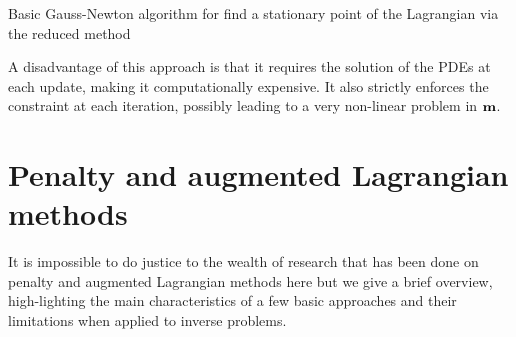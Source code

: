 \documentclass{iopart}
\begin{document}
\begin{algorithm}
\caption{Basic Gauss-Newton algorithm for find a stationary point of the Lagrangian via the reduced method}
\label{alg:reduced}
\begin{algorithmic}
\vspace{1mm}
\vspace{1mm}
\vspace{1mm}
\vspace{2mm}
\vspace{1mm}
\STATE{determine steplength $\alpha^k \in (0,1]$}
\vspace{1mm}
\vspace{1mm}
\vspace{2mm}
\vspace{1mm}
\ENDWHILE
\end{algorithmic}
\end{algorithm}

A disadvantage of this approach is that it requires the solution of the PDEs at each update, making it computationally expensive.  It also strictly enforces the constraint at each iteration, possibly leading to a very non-linear problem in $\mathbf{m}$. 

\section{Penalty and augmented Lagrangian methods}
\label{penalty}
It is impossible to do justice to the wealth of research that has been done on penalty and augmented Lagrangian methods here but we give a brief overview, high-lighting the main characteristics of a few basic approaches and their limitations when applied to inverse problems. 
\end{document}
